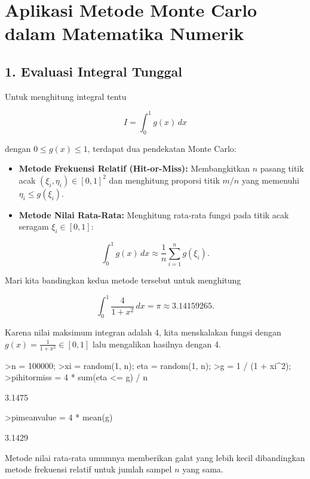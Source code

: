 \documentclass[a4paper,11pt,oneside,enabledeprecatedfontcommands]{scrbook}
\newenvironment{eulernotebook}{}{}
\newcommand{\eulerheading}[1]{\chapter{#1}}
\newcommand{\eulersubheading}[1]{\section{#1}}
\newenvironment{eulercomment}{\par\medskip\noindent}{\par\medskip}
\newenvironment{eulerformula}{}{}
\begin{document}
\begin{eulernotebook}
		\eulerheading{Aplikasi Metode Monte Carlo dalam Matematika Numerik}
		\eulersubheading{1. Evaluasi Integral Tunggal}
		\begin{eulercomment}
			Untuk menghitung integral tentu
		\end{eulercomment}
		\begin{eulerformula}
			\[
			I = \int_0^1 g(x)\,dx
			\]
		\end{eulerformula}
		\begin{eulercomment}
			dengan $0 \le g(x) \le 1$, terdapat dua pendekatan Monte Carlo:
			\begin{itemize}
				\item \textbf{Metode Frekuensi Relatif (Hit-or-Miss):} Membangkitkan $n$ pasang titik acak $(\xi_i, \eta_i) \in [0, 1]^2$ dan menghitung proporsi titik $m/n$ yang memenuhi $\eta_i \le g(\xi_i)$.
				\item \textbf{Metode Nilai Rata-Rata:} Menghitung rata-rata fungsi pada titik acak seragam $\xi_i \in [0, 1]$:
			\end{itemize}
		\end{eulercomment}
		\begin{eulerformula}
			\[
			\int_0^1 g(x)\,dx \approx \frac{1}{n}\sum_{i=1}^n g(\xi_i).
			\]
		\end{eulerformula}
		\begin{eulercomment}
			Mari kita bandingkan kedua metode tersebut untuk menghitung
		\end{eulercomment}
		\begin{eulerformula}
			\[
			\int_0^1 \frac{4}{1 + x^2}\,dx = \pi \approx 3.14159265.
			\]
		\end{eulerformula}
		\begin{eulercomment}
			Karena nilai maksimum integran adalah 4, kita menskalakan fungsi dengan $g(x) = \frac{1}{1+x^2} \in [0, 1]$
			lalu mengalikan hasilnya dengan 4.
		\end{eulercomment}
		\begin{eulerprompt}
			>n = 100000;
			>xi = random(1, n); eta = random(1, n);
			>g = 1 / (1 + xi^2);
			>pihitormiss = 4 * sum(eta <= g) / n
		\end{eulerprompt}
		\begin{euleroutput}
			3.1475
		\end{euleroutput}
		\begin{eulerprompt}
			>pimeanvalue = 4 * mean(g)
		\end{eulerprompt}
		\begin{euleroutput}
			3.1429
		\end{euleroutput}
		\begin{eulercomment}
			Metode nilai rata-rata umumnya memberikan galat yang lebih kecil dibandingkan metode frekuensi
			relatif untuk jumlah sampel $n$ yang sama.
		\end{eulercomment}
		

\end{eulernotebook}
\end{document}
